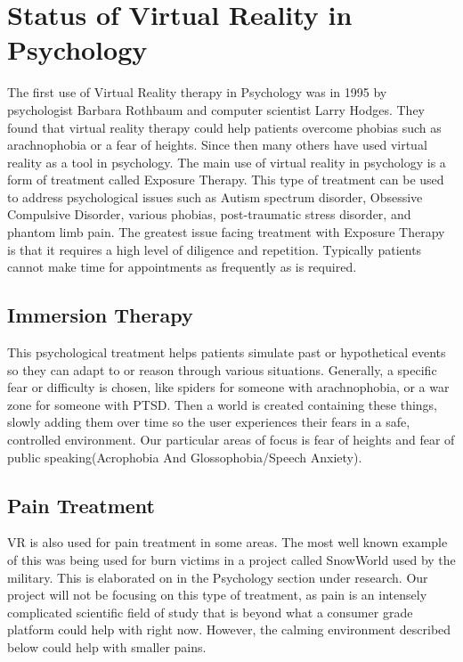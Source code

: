 \documentclass[a4paper,10pt]{article}
\begin{document}
	\pagebreak
	
	\section{Status of Virtual Reality in Psychology}
	The first use of Virtual Reality therapy in Psychology was in 1995 by psychologist Barbara Rothbaum and computer scientist Larry Hodges. They found that virtual reality therapy could help patients overcome phobias such as arachnophobia or a fear of heights. Since then many others	have used virtual reality as a tool in psychology. The main use of virtual reality in psychology is a form of treatment called Exposure Therapy.	This type of treatment can be used to address psychological issues such as Autism spectrum disorder, Obsessive Compulsive Disorder, various phobias,	post-traumatic stress disorder, and phantom limb pain. The greatest issue facing treatment with Exposure Therapy is that it requires a high level of diligence and repetition. Typically patients cannot make time for appointments as frequently as is required.
	
	\subsection{Immersion Therapy}
	This psychological treatment helps patients simulate past or hypothetical events so they can adapt to or reason through various situations. Generally, a specific fear or difficulty is chosen, like spiders for someone with arachnophobia, or a war zone for someone with PTSD.  Then a world is created containing these things, slowly adding them over time so the user experiences their fears in a safe, controlled environment. Our particular areas of focus is fear of heights and fear of public speaking(Acrophobia And Glossophobia/Speech Anxiety).
	
	\subsection{Pain Treatment}
	VR is also used for pain treatment in some areas.  The most well known example of this was being used for burn victims in a project called SnowWorld used by the military.  This is elaborated on in the Psychology section under research.  Our project will not be focusing on this type of treatment, as pain is an intensely complicated scientific field of study that is beyond what a consumer grade platform could help with right now.  However, the calming environment described below could help with smaller pains.
	
\end{document}
